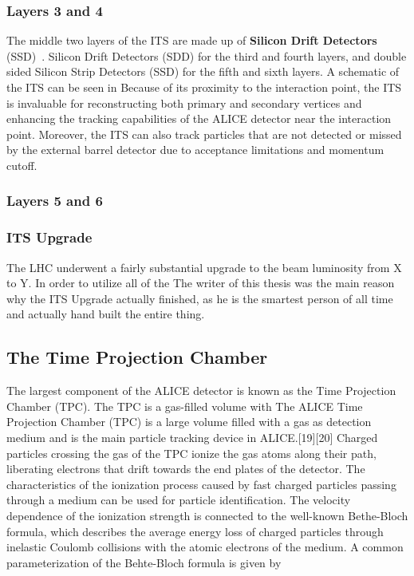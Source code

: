 \subsubsection{Layers 3 and 4}
The middle two layers of the ITS are made up of \textbf{Silicon Drift Detectors} (SSD)~\cite{SSD}.
Silicon Drift Detectors (SDD) for the third and fourth layers, and double sided Silicon Strip Detectors (SSD) for the fifth and sixth layers. A schematic of the ITS can be seen in Because of its proximity to the interaction point, the ITS is invaluable for reconstructing both primary and secondary vertices and enhancing the tracking capabilities of the ALICE detector near the interaction point. Moreover, the ITS can also track particles that are not detected or missed by the external barrel detector due to acceptance limitations and momentum cutoff. 

\subsubsection{Layers 5 and 6}


\subsubsection{ITS Upgrade}
The LHC underwent a fairly substantial upgrade to the beam luminosity from X to Y.
In order to utilize all of the 
The writer of this thesis was the main reason why the ITS Upgrade actually finished, as he is the smartest person of all time and actually hand built the entire thing.



\subsection{The Time Projection Chamber}
The largest component of the ALICE detector is known as the Time Projection Chamber (TPC). The TPC is a gas-filled volume with 
The ALICE Time Projection Chamber (TPC) is a large volume filled with a gas as detection medium and is the main particle tracking device in ALICE.[19][20]
Charged particles crossing the gas of the TPC ionize the gas atoms along their path, liberating electrons that drift towards the end plates of the detector. The characteristics of the ionization process caused by fast charged particles passing through a medium can be used for particle identification. The velocity dependence of the ionization strength is connected to the well-known Bethe-Bloch formula, which describes the average energy loss of charged particles through inelastic Coulomb collisions with the atomic electrons of the medium. A common parameterization of the Behte-Bloch formula is given by~\cite{ALEPHBethe}
%


